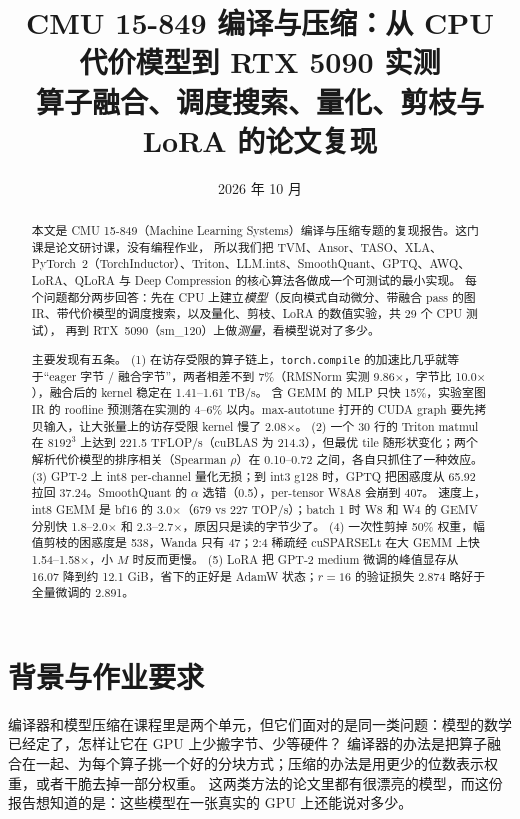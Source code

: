 \documentclass[11pt,a4paper]{ctexart}
\title{CMU 15-849 编译与压缩：从 CPU 代价模型到 RTX 5090 实测\\\large 算子融合、调度搜索、量化、剪枝与 LoRA 的论文复现}
\author{\authorline}
\date{2026 年 10 月}
\begin{document}
\maketitle

\begin{abstract}
本文是 CMU 15-849（Machine Learning Systems）编译与压缩专题的复现报告。这门课是论文研讨课，没有编程作业，
所以我们把 TVM、Ansor、TASO、XLA、PyTorch~2（TorchInductor）、Triton、LLM.int8、SmoothQuant、GPTQ、AWQ、LoRA、QLoRA 与 Deep Compression 的核心算法各做成一个可测试的最小实现。
每个问题都分两步回答：先在 CPU 上建立\emph{模型}（反向模式自动微分、带融合 pass 的图 IR、带代价模型的调度搜索，以及量化、剪枝、LoRA 的数值实验，共 29 个 CPU 测试），
再到 RTX~5090（sm\_120）上做\emph{测量}，看模型说对了多少。

主要发现有五条。
(1) 在访存受限的算子链上，\texttt{torch.compile} 的加速比几乎就等于“eager 字节 / 融合字节”，两者相差不到 7\%（RMSNorm 实测 9.86$\times$，字节比 10.0$\times$），融合后的 kernel 稳定在 1.41--1.61 TB/s。
含 GEMM 的 MLP 只快 15\%，实验室图 IR 的 roofline 预测落在实测的 4--6\% 以内。max-autotune 打开的 CUDA graph 要先拷贝输入，让大张量上的访存受限 kernel 慢了 2.08$\times$。
(2) 一个 30 行的 Triton matmul 在 $8192^3$ 上达到 221.5 TFLOP/s（cuBLAS 为 214.3），但最优 tile 随形状变化；两个解析代价模型的排序相关（Spearman $\rho$）在 0.10--0.72 之间，各自只抓住了一种效应。
(3) GPT-2 上 int8 per-channel 量化无损；到 int3 g128 时，GPTQ 把困惑度从 65.92 拉回 37.24。SmoothQuant 的 $\alpha$ 选错（0.5），per-tensor W8A8 会崩到 407。
速度上，int8 GEMM 是 bf16 的 3.0$\times$（679 vs 227 TOP/s）；batch 1 时 W8 和 W4 的 GEMV 分别快 1.8--2.0$\times$ 和 2.3--2.7$\times$，原因只是读的字节少了。
(4) 一次性剪掉 50\% 权重，幅值剪枝的困惑度是 538，Wanda 只有 47；2:4 稀疏经 cuSPARSELt 在大 GEMM 上快 1.54--1.58$\times$，小 $M$ 时反而更慢。
(5) LoRA 把 GPT-2 medium 微调的峰值显存从 16.07 降到约 12.1 GiB，省下的正好是 AdamW 状态；$r{=}16$ 的验证损失 2.874 略好于全量微调的 2.891。
\end{abstract}

\tableofcontents
\newpage

\section{背景与作业要求}

编译器和模型压缩在课程里是两个单元，但它们面对的是同一类问题：模型的数学已经定了，怎样让它在 GPU 上少搬字节、少等硬件？
编译器的办法是把算子融合在一起、为每个算子挑一个好的分块方式；压缩的办法是用更少的位数表示权重，或者干脆去掉一部分权重。
这两类方法的论文里都有很漂亮的模型，而这份报告想知道的是：这些模型在一张真实的 GPU 上还能说对多少。
\end{document}
